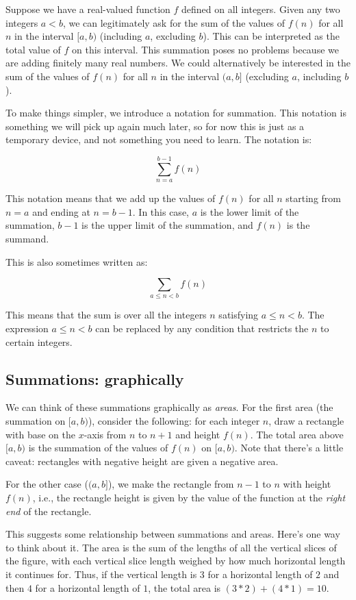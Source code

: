 \documentclass{amsart}
\begin{document}
Suppose we have a real-valued function $f$ defined on all
integers. Given any two integers $a < b$, we can legitimately ask for
the sum of the values of $f(n)$ for all $n$ in the interval $[a,b)$
(including $a$, excluding $b$). This can be interpreted as the total
value of $f$ on this interval. This summation poses no problems
because we are adding finitely many real numbers. We could
alternatively be interested in the sum of the values of $f(n)$ for all
$n$ in the interval $(a,b]$ (excluding $a$, including $b$).

To make things simpler, we introduce a notation for summation. This
notation is something we will pick up again much later, so for now
this is just as a temporary device, and not something you need to
learn. The notation is:

$$\sum_{n = a}^{b-1} f(n)$$

This notation means that we add up the values of $f(n)$ for all $n$
starting from $n = a$ and ending at $n = b - 1$. In this case, $a$ is
the lower limit of the summation, $b - 1$ is the upper limit of the
summation, and $f(n)$ is the summand.

This is also sometimes written as:

$$\sum_{a \le n < b} f(n)$$

This means that the sum is over all the integers $n$ satisfying $a \le
n < b$. The expression $a \le n < b$ can be replaced by any condition
that restricts the $n$ to certain integers.

\subsection{Summations: graphically}

We can think of these summations graphically as {\em areas}. For the
first area (the summation on $[a,b)$), consider the following: for each
integer $n$, draw a rectangle with base on the $x$-axis from $n$ to $n
+ 1$ and height $f(n)$. The total area above $[a,b)$ is the summation
of the values of $f(n)$ on $[a,b)$. Note that there's a little caveat:
rectangles with negative height are given a negative area. 

For the other case ($(a,b]$), we make the rectangle from $n - 1$ to
$n$ with height $f(n)$, i.e., the rectangle height is given by the
value of the function at the {\em right end} of the rectangle.

This suggests some relationship between summations and areas. Here's
one way to think about it. The area is the sum of the lengths of all
the vertical slices of the figure, with each vertical slice length
weighed by how much horizontal length it continues for. Thus, if the
vertical length is $3$ for a horizontal length of $2$ and then $4$ for
a horizontal length of $1$, the total area is $(3 * 2) + (4 * 1) = 10$.
\end{document}
